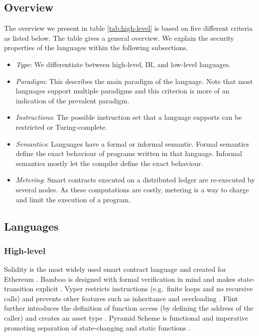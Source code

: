 \subsection{Overview}
The overview we present in table \ref{tab:high-level} is based on five different criteria as listed below. The table gives a general overview. We explain the security properties of the languages within the following subsections.
\begin{itemize}
\item \emph{Type}: We differentiate between high-level, IR, and low-level languages.
\item \emph{Paradigm}: This describes the main paradigm of the language. Note that most languages support multiple paradigms and this criterion is more of an indication of the prevalent paradigm.
\item \emph{Instructions}: The possible instruction set that a language supports can be restricted or Turing-complete.
\item \emph{Semantics}: Languages have a formal or informal semantic. Formal semantics define the exact behaviour of programs written in that language. Informal semantics mostly let the compiler define the exact behaviour.
\item \emph{Metering}: Smart contracts executed on a distributed ledger are re-executed by several nodes. As these computations are costly, metering is a way to charge and limit the execution of a program.
\end{itemize}



\subsection{Languages}

\subsubsection{High-level}
Solidity is the most widely used smart contract language and created for Ethereum \cite{Ethereum2018Solidity}.
Bamboo is designed with formal verification in mind and makes state-transition explicit \cite{Hirai2018Bamboo}. 
Vyper restricts instructions (e.g.\ finite loops and no recursive calls) and prevents other features such as inheritance and overloading \cite{Ethereum2018Vyper}. 
Flint further introduces the definition of function access (by defining the address of the caller) and creates an asset type \cite{Schrans2018}. 
Pyramid Scheme is functional and imperative promoting separation of state-changing and static functions \cite{Burge2018}.

